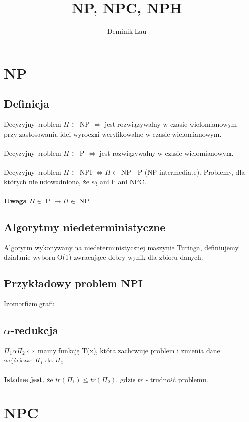 \documentclass{article}
\title{NP, NPC, NPH}
\author{Dominik Lau}
\begin{document}
\maketitle

\section{NP}
\subsection{Definicja}
Decyzyjny problem $\Pi \in$ NP $\iff$ jest rozwiązywalny w czasie wielomianowym przy zastosowaniu idei wyroczni weryfikowalne w czasie wielomianowym. \\\\
Decyzyjny problem $\Pi \in$ P $\iff$ jest rozwiązywalny w czasie wielomianowym. \\\\
Decyzyjny problem $\Pi \in$ NPI $\iff \Pi \in$ NP - P (NP-intermediate).  Problemy, dla których nie udowodniono, że są ani P ani NPC.\\\\
\textbf{Uwaga}
$\Pi \in$ P $\rightarrow \Pi \in$ NP 

\subsection{Algorytmy niedeterministyczne}
Algorytm wykonywany na niedeterministycznej maszynie Turinga, definiujemy działanie wyboru O(1)
zwracające dobry wynik dla zbioru danych.

\subsection{Przykładowy problem NPI}
Izomorfizm grafu

\subsection{$\alpha$-redukcja}
$\Pi_1 \alpha \Pi_2 \iff$  mamy funkcję T(x), która zachowuje problem i 
zmienia dane wejściowe $\Pi_1$ do $\Pi_2$. \\\\
\textbf{Istotne jest}, że $tr(\Pi_1) \leq tr(\Pi_2)$, gdzie $tr$ - trudność problemu.

\section{NPC}
\end{document}
